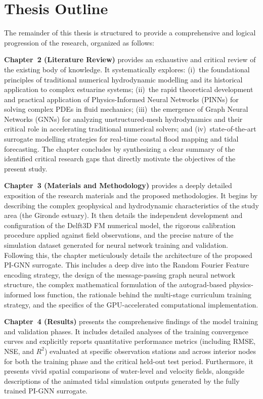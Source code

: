 \section{Thesis Outline}

The remainder of this thesis is structured to provide a comprehensive and logical progression of the research, organized as follows:

\textbf{Chapter~2 (Literature Review)} provides an exhaustive and critical review of the existing body of
knowledge. It systematically explores: (i)~the foundational principles of traditional numerical hydrodynamic modelling and its historical
application to complex estuarine systems; (ii)~the rapid theoretical development and practical application
of Physics-Informed Neural Networks (PINNs) for solving complex PDEs in fluid mechanics; (iii)~the emergence of Graph Neural Networks (GNNs) for analyzing unstructured-mesh hydrodynamics and
their critical role in accelerating traditional numerical solvers; and (iv)~state-of-the-art surrogate
modelling strategies for real-time coastal flood mapping and tidal forecasting.
The chapter concludes by synthesizing a clear summary of the identified critical research gaps that directly
motivate the objectives of the present study.

\textbf{Chapter~3 (Materials and Methodology)} provides a deeply detailed exposition of the research materials and the proposed methodologies. It begins by describing the complex geophysical and hydrodynamic characteristics of the study area
(the Gironde estuary). It then details the independent development and configuration of the Delft3D FM numerical model, the rigorous
calibration procedure applied against field observations, and the precise nature of the simulation dataset generated for neural network training and
validation. Following this, the chapter meticulously details the architecture of the proposed PI-GNN surrogate. This includes a deep dive into
the Random Fourier Feature encoding strategy, the design of the message-passing graph neural network structure, the complex mathematical formulation of the
autograd-based physics-informed loss function, the rationale behind the multi-stage curriculum training strategy,
and the specifics of the GPU-accelerated computational implementation.

\textbf{Chapter~4 (Results)} presents the comprehensive findings of the model training and validation phases. It includes detailed analyses of the training convergence curves and explicitly reports
quantitative performance metrics (including RMSE, NSE, and $R^2$) evaluated at specific observation
stations and across interior nodes for both the training phase and the critical held-out test
period. Furthermore, it presents vivid spatial comparisons of water-level and velocity fields, alongside descriptions of the animated
tidal simulation outputs generated by the fully trained PI-GNN surrogate.

